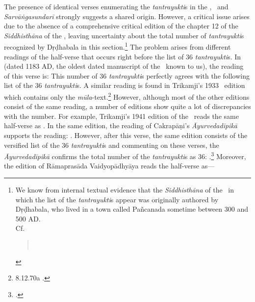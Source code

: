The presence of identical verses enumerating the \emph{tantrayukti}s in the \AHS, \CS\ and \emph{Sarvāṅgasundarī} strongly suggests a shared origin. However, a critical issue arises due to the absence of a comprehensive critical edition of the chapter 12 of the \emph{Siddhisthāna} of the \CS, leaving uncertainty about the total number of \emph{tantrayukti}s recognized by Dṛḍhabala in this section.\footnote{We know from internal textual evidence that the \emph{Siddhisthāna} of the \CS\ in which the list of the \emph{tantrayukti}s appear was originally authored by Dṛḍhabala, who lived in a town called Pañcanada sometime between 300 and 500 AD. \\Cf. 
	\begin{verse}
		 \\
	\end{verse}
	} 
The problem arises from different readings of the half-verse that occurs right before the list of 36 \emph{tantrayukti}s. In  (dated 1183 AD, the oldest dated manuscript of the \CS\ known to us), the reading of this verse is:	
This number of 36 \emph{tantrayukti}s perfectly agrees with the following list of 
the 36 \emph{tantrayukti}s. A similar reading is found in Trikamji's 1933 
\CS\ edition which contains only the 
\emph{mūla}-text.\footnote{		
	8.12.70a \parencite[972]{cara-trikamji}.} 
However, although most of the other editions consist of the same reading, a number of editions show quite a lot of discrepancies with the number. For example, Trikamji's 1941 edition of the \CS\ reads the same half-verse as 
 . 
In the same edition, the reading of Cakrapāṇi's \emph{Āyurvedadīpikā} supports the reading: 
. 
However, after this verse, the same edition consists of the versified list of the 36 \emph{tantrayukti}s and commenting on these verses, the \emph{Āyurvedadīpikā} confirms the total number of the \emph{tantrayukti}s as 36: 
.\footcite[737]{cara-trikamji3} 
Moreover, the edition of Rāmaprasāda Vaidyopādhyāya reads the half-verse as--- 
